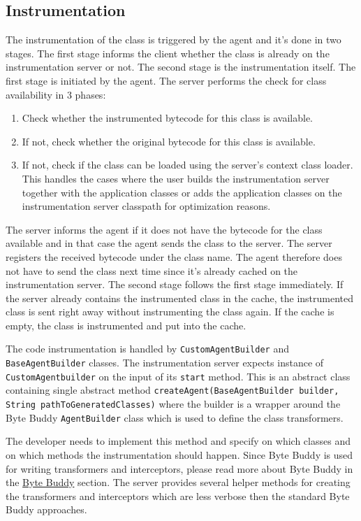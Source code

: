 \subsection{Instrumentation}
The instrumentation of the class is triggered by the agent and it's done in two stages. The first stage informs the client whether the class is already on the instrumentation server or not. The second stage is the instrumentation itself. The first stage is initiated by the agent. The server performs the check for class availability in 3 phases:
\begin{enumerate}
	\item Check whether the instrumented bytecode for this class is available.
	\item If not, check whether the original bytecode for this class is available.
	\item If not, check if the class can be loaded using the server's context class loader. This handles the cases where the user builds the instrumentation server together with the application classes or adds the application classes on the instrumentation server classpath for optimization reasons.
\end{enumerate}

The server informs the agent if it does not have the bytecode for the class available and in that case  the agent sends the class to the server. The server registers the received bytecode under the class name. The agent therefore does not have to send the class next time since it's already cached on the instrumentation server.
The second stage follows the first stage immediately. If the server already contains the instrumented class in the cache, the instrumented class is sent right away without instrumenting the class again. If the cache is empty, the class is instrumented and put into the cache.

The code instrumentation is handled by \texttt{CustomAgentBuilder} and \texttt{BaseAgentBuilder} classes.
The instrumentation server expects instance of \texttt{CustomAgentbuilder} on the input of its \texttt{start} method. This is an abstract class containing single abstract method \texttt{createAgent(BaseAgentBuilder builder, String pathToGeneratedClasses)} where the builder is a wrapper around the Byte Buddy \texttt{AgentBuilder} class which is used to define the class transformers.

The developer needs to implement this method and specify on which classes and on which methods the instrumentation should happen. Since Byte Buddy is used for writing transformers and interceptors, please read more about Byte Buddy in the \hyperref[sec:byte_buddy]{Byte Buddy} section. The server provides several helper methods for creating the transformers and interceptors which are less verbose then the standard Byte Buddy approaches.


